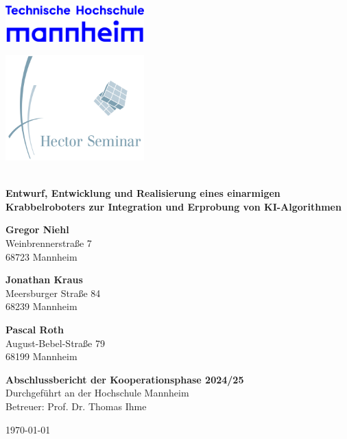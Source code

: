 \documentclass[12pt,a4paper]{article}
\begin{document}
	
	\begin{titlepage}
		\begin{minipage}[c]{0.49\textwidth}
			\raggedright
			\includegraphics[width=0.4\textwidth]{TH_Mannheim_Logo_RGB_blau.png}
		\end{minipage}
		\hfill
		\begin{minipage}[c]{0.49\textwidth}
			\raggedleft
			\includegraphics[width=0.4\textwidth]{logo.png}
		\end{minipage}
		\\[1cm]
		\centering
		\textbf{\LARGE{Entwurf, Entwicklung und Realisierung eines einarmigen Krabbelroboters zur Integration und Erprobung von KI-Algorithmen}} \\[2cm]
		
		\vfill
			\begin{minipage}[t]{0.32\textwidth}
			    \raggedright
			    \textbf{Gregor Niehl} \\
			    Weinbrennerstraße 7 \\
			    68723 Mannheim \\
			\end{minipage}
			\hfill
			\begin{minipage}[t]{0.32\textwidth}
			    \centering
			    \textbf{Jonathan Kraus} \\
			    Meersburger Straße 84 \\
			    68239 Mannheim \\
			\end{minipage}
			\hfill
			\begin{minipage}[t]{0.32\textwidth}
			    \raggedleft
			    \textbf{Pascal Roth} \\
			    August-Bebel-Straße 79\\
			    68199 Mannheim \\
			\end{minipage}
		\vfill
		
		\textbf{Abschlussbericht der Kooperationsphase 2024/25} \\
		Durchgeführt an der Hochschule Mannheim \\
		Betreuer: Prof. Dr. Thomas Ihme \\
		\vfill
		
		\today
	\end{titlepage}
	
\end{document}
